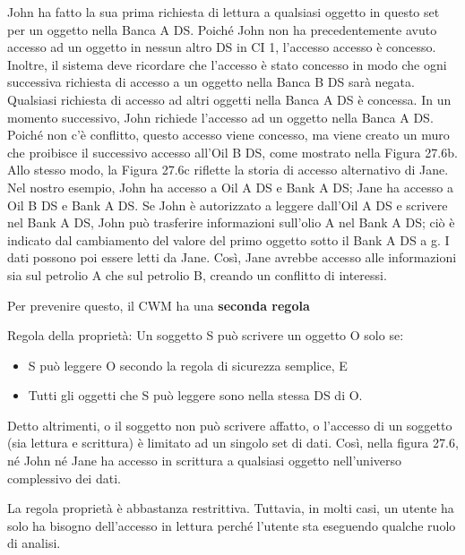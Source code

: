 John ha fatto la sua prima richiesta di lettura a qualsiasi oggetto in questo set per un oggetto nella Banca A DS. Poiché John non ha precedentemente avuto accesso ad un oggetto in nessun altro DS in CI 1, l'accesso accesso è concesso. Inoltre, il sistema deve ricordare che l'accesso è stato concesso in modo che ogni successiva richiesta di accesso a un oggetto nella Banca B DS sarà negata. Qualsiasi richiesta di accesso ad altri oggetti nella Banca A DS è concessa. In un momento successivo, John richiede l'accesso ad un oggetto nella Banca A DS. Poiché non c'è conflitto, questo accesso viene concesso, ma viene creato un muro che proibisce il successivo accesso all'Oil B DS, come mostrato nella Figura 27.6b. Allo stesso modo, la Figura 27.6c riflette la storia di accesso alternativo di Jane. Nel nostro esempio, John ha accesso a Oil A DS e Bank A DS; Jane ha accesso a Oil B DS e Bank A DS. Se John è autorizzato a leggere dall'Oil A DS e scrivere nel Bank A DS, John può trasferire informazioni sull'olio A nel Bank A DS; ciò è indicato dal cambiamento del valore del primo oggetto sotto il Bank A DS a g. I dati possono poi essere letti da Jane. Così, Jane avrebbe accesso alle informazioni sia sul petrolio A che sul petrolio B, creando un conflitto di interessi.

\begin{center}
    Per prevenire questo, il CWM ha una \textbf{seconda regola}
\end{center}

Regola della proprietà: Un soggetto S può scrivere un oggetto O solo se:

\begin{itemize}
    \item S può leggere O secondo la regola di sicurezza semplice, E
    
    \item Tutti gli oggetti che S può leggere sono nella stessa DS di O.
\end{itemize}

Detto altrimenti, o il soggetto non può scrivere affatto, o l'accesso di un soggetto (sia lettura e scrittura) è limitato ad un singolo set di dati. Così, nella figura 27.6, né John né Jane ha accesso in scrittura a qualsiasi oggetto nell'universo complessivo dei dati.

\singlespacing

La regola proprietà è abbastanza restrittiva. Tuttavia, in molti casi, un utente ha solo ha bisogno dell'accesso in lettura perché l'utente sta eseguendo qualche ruolo di analisi.

